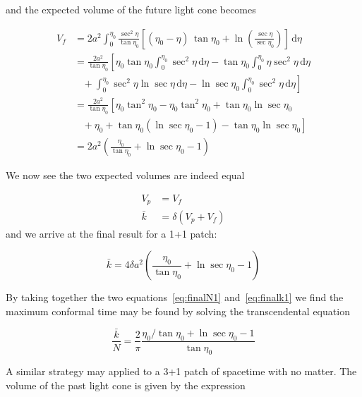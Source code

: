 \documentclass[preprint,notitlepage,amsmath,amssymb,floatfix]{revtex4-1}
\begin{document}
\noindent and the expected volume of the future light cone becomes

\begin{equation}
\begin{split}
V_f &= 2a^2\int_0^{\eta_0} \! \frac{\sec^2\eta}{\tan\eta_0} \left[\left(\eta_0 - \eta\right)\,\tan\eta_0 + \ln\left(\frac{\sec\eta}{\sec\eta_0}\right) \right]\,\mathrm{d}\eta \\
  &= \frac{2a^2}{\tan\eta_0}\left[\eta_0\tan\eta_0\int_0^{\eta_0}\!\sec^2\eta\,\mathrm{d}\eta - \tan\eta_0 \int_0^{\eta_0}\!\eta\sec^2\eta\,\mathrm{d}\eta\right. \\ & \left.\,\,\,\,\, + \int_0^{\eta_0}\!\sec^2\eta\ln\sec\eta\,\mathrm{d}\eta - \ln\sec\eta_0\int_0^{\eta_0}\!\sec^2\eta\,\mathrm{d}\eta\right] \\
  &= \frac{2a^2}{\tan\eta_0}\left[\eta_0\tan^2\eta_0 - \eta_0\tan^2\eta_0 + \tan\eta_0\ln\sec\eta_0\right. \\ & \left.\,\,\,\,\, + \eta_0 + \tan\eta_0\left(\ln\sec\eta_0 - 1\right) - \tan\eta_0\ln\sec\eta_0\right] \\
  &= 2a^2\left(\frac{\eta_0}{\tan\eta_0} + \ln\sec\eta_0 - 1\right)
\end{split}
\end{equation}

\noindent We now see the two expected volumes are indeed equal

\begin{align}
V_p &= V_f \\
\bar{k} &= \delta\left( V_p + V_f \right)
\end{align}
\noindent and we arrive at the final result for a 1+1 patch:

\begin{equation}
\label{eq:finalk1}
\bar k = 4 \delta a^2 \left( \frac{\eta_0}{\tan\eta_0} + \ln\sec\eta_0 - 1 \right)
\end{equation}

\noindent By taking together the two equations~\eqref{eq:finalN1} and~\eqref{eq:finalk1} we find the maximum conformal time may be found by solving the transcendental equation

\begin{equation}
\label{eq:trans1}
\frac{\bar k}{N} = \frac{2}{\pi}\frac{\eta_0 / \tan\eta_0 + \ln\sec\eta_0 - 1}{\tan\eta_0}
\end{equation}

\noindent A similar strategy may applied to a 3+1 patch of spacetime with no matter.  The volume of the past light cone is given by the expression
\end{document}
